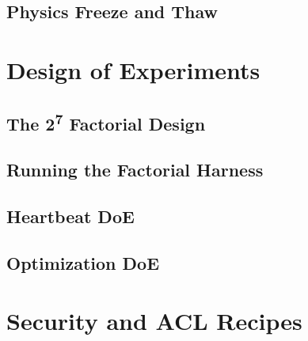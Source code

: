 \chapter{Physics Freeze and Thaw}

\part{Design of Experiments}

\chapter{The 2\textsuperscript{7} Factorial Design}

\chapter{Running the Factorial Harness}




\chapter{Heartbeat DoE}



\chapter{Optimization DoE}




\part{Security and ACL Recipes}

